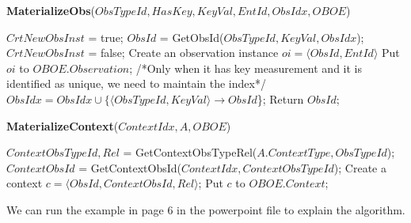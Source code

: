 \documentclass[10pt]{article}
\begin{document}
\begin{algorithm} [htb]
\caption{{\bf MaterializeObs}($ObsTypeId, HasKey,KeyVal,EntId, ObsIdx, OBOE$)}
\begin{algorithmic}
		\STATE $CrtNewObsInst$ = true;
			\STATE $ObsId$ = GetObsId($ObsTypeId, KeyVal, ObsIdx$); %
				\STATE $CrtNewObsInst$ = false;
			\ENDIF
		\ENDIF
    		\STATE Create an observation instance $oi = \langle ObsId,  EntId\rangle $
    		\STATE Put $oi$ to $OBOE.Observation$;
                \STATE /*Only when it has key measurement and it is identified as unique, we need to maintain the index*/
                \STATE $ObsIdx = ObsIdx \cup \{\langle ObsTypeId, KeyVal \rangle \rightarrow ObsId$\};
            \ENDIF
		\ENDIF
		\STATE Return $ObsId$;
\end{algorithmic}
\end{algorithm}


\begin{algorithm} [htb]
\caption{{\bf MaterializeContext}($ContextIdx, A, OBOE$)}
\begin{algorithmic}
\STATE $ContextObsTypeId, Rel$ = GetContextObsTypeRel($A.ContextType, ObsTypeId$);
	\STATE $ContextObsId$ = GetContextObsId($ContextIdx, ContextObsTypeId$);
	\STATE Create a context $c=\langle ObsId, ContextObsId, Rel\rangle$;
	\STATE Put $c$ to $OBOE.Context$;
\ENDIF
\ENDFOR
\end{algorithmic}
\end{algorithm}

We can run the example in page 6 in the powerpoint file to explain the algorithm.
\end{document}
